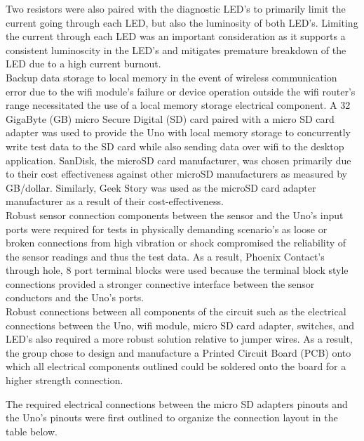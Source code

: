 \documentclass[12pt, titlepage]{article}
\begin{document}
Two resistors were also paired with the diagnostic LED's to primarily limit the current going through each LED, but also the luminosity of both LED's. Limiting the current through each LED was an important consideration as it supports a consistent luminoscity in the LED's and mitigates premature breakdown of the LED due to a high current burnout. \\

Backup data storage to local memory in the event of wireless communication error due to the wifi module's failure or device operation outside the wifi router's range necessitated the use of a local memory storage electrical component. A 32 GigaByte (GB) micro Secure Digital (SD) card paired with a micro SD card adapter was used to provide the Uno with local memory storage to concurrently write test data to the SD card while also sending data over wifi to the desktop application. SanDisk, the microSD card manufacturer, was chosen primarily due to their cost effectiveness against other microSD manufacturers as measured by GB/dollar. Similarly, Geek Story was used as the microSD card adapter manufacturer as a result of their cost-effectiveness. \\

Robust sensor connection components between the sensor and the Uno's input ports were required for tests in physically demanding scenario's as loose or broken connections from high vibration or shock compromised the reliability of the sensor readings and thus the test data. As a result, Phoenix Contact's through hole, 8 port terminal blocks were used because the terminal block style connections provided a stronger connective interface between the sensor conductors and the Uno's ports. \\

Robust connections between all components of the circuit such as the electrical connections between the Uno, wifi module, micro SD card adapter, switches, and LED's also required a more robust solution relative to jumper wires. As a result, the group chose to design and manufacture a Printed Circuit Board (PCB) onto which all electrical components outlined could be soldered onto the board for a higher strength connection. \\
\newpage

The required electrical connections between the micro SD adapters pinouts and the Uno's pinouts were first outlined to organize the connection layout in the table below. \\
\end{document}
